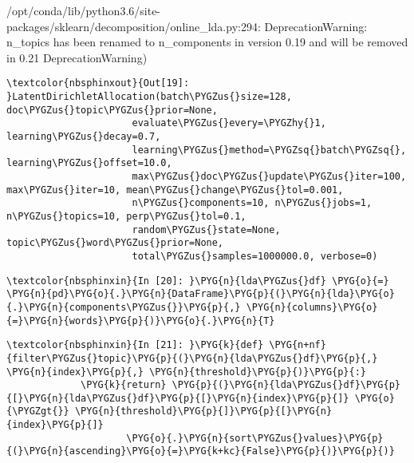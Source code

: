 \documentclass[letterpaper,10pt,english]{sphinxmanual}
\begin{document}
%
\begin{OriginalVerbatim}[commandchars=\\\{\}]
/opt/conda/lib/python3.6/site-packages/sklearn/decomposition/online\_lda.py:294: DeprecationWarning: n\_topics has been renamed to n\_components in version 0.19 and will be removed in 0.21
  DeprecationWarning)
\end{OriginalVerbatim}
\relax

%
\begin{Verbatim}[commandchars=\\\{\}]
\textcolor{nbsphinxout}{Out[19]: }LatentDirichletAllocation(batch\PYGZus{}size=128, doc\PYGZus{}topic\PYGZus{}prior=None,
                      evaluate\PYGZus{}every=\PYGZhy{}1, learning\PYGZus{}decay=0.7,
                      learning\PYGZus{}method=\PYGZsq{}batch\PYGZsq{}, learning\PYGZus{}offset=10.0,
                      max\PYGZus{}doc\PYGZus{}update\PYGZus{}iter=100, max\PYGZus{}iter=10, mean\PYGZus{}change\PYGZus{}tol=0.001,
                      n\PYGZus{}components=10, n\PYGZus{}jobs=1, n\PYGZus{}topics=10, perp\PYGZus{}tol=0.1,
                      random\PYGZus{}state=None, topic\PYGZus{}word\PYGZus{}prior=None,
                      total\PYGZus{}samples=1000000.0, verbose=0)
\end{Verbatim}

%
\begin{Verbatim}[commandchars=\\\{\}]
\textcolor{nbsphinxin}{In [20]: }\PYG{n}{lda\PYGZus{}df} \PYG{o}{=} \PYG{n}{pd}\PYG{o}{.}\PYG{n}{DataFrame}\PYG{p}{(}\PYG{n}{lda}\PYG{o}{.}\PYG{n}{components\PYGZus{}}\PYG{p}{,} \PYG{n}{columns}\PYG{o}{=}\PYG{n}{words}\PYG{p}{)}\PYG{o}{.}\PYG{n}{T}
\end{Verbatim}

%
\begin{Verbatim}[commandchars=\\\{\}]
\textcolor{nbsphinxin}{In [21]: }\PYG{k}{def} \PYG{n+nf}{filter\PYGZus{}topic}\PYG{p}{(}\PYG{n}{lda\PYGZus{}df}\PYG{p}{,} \PYG{n}{index}\PYG{p}{,} \PYG{n}{threshold}\PYG{p}{)}\PYG{p}{:}
             \PYG{k}{return} \PYG{p}{(}\PYG{n}{lda\PYGZus{}df}\PYG{p}{[}\PYG{n}{lda\PYGZus{}df}\PYG{p}{[}\PYG{n}{index}\PYG{p}{]} \PYG{o}{\PYGZgt{}} \PYG{n}{threshold}\PYG{p}{]}\PYG{p}{[}\PYG{n}{index}\PYG{p}{]}
                     \PYG{o}{.}\PYG{n}{sort\PYGZus{}values}\PYG{p}{(}\PYG{n}{ascending}\PYG{o}{=}\PYG{k+kc}{False}\PYG{p}{)}\PYG{p}{)}
\end{Verbatim}
\end{document}
